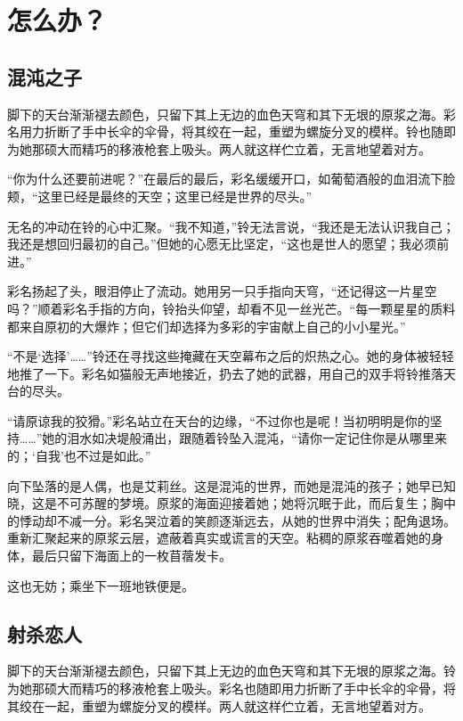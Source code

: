 \chapter{怎么办？}

\section{ 混沌之子}

脚下的天台渐渐褪去颜色，只留下其上无边的血色天穹和其下无垠的原浆之海。彩名用力折断了手中长伞的伞骨，将其绞在一起，重塑为螺旋分叉的模样。铃也随即为她那硕大而精巧的移液枪套上吸头。两人就这样伫立着，无言地望着对方。

“你为什么还要前进呢？”在最后的最后，彩名缓缓开口，如葡萄酒般的血泪流下脸颊，“这里已经是最终的天空；这里已经是世界的尽头。”

无名的冲动在铃的心中汇聚。“我不知道，”铃无法言说，“我还是无法认识我自己；我还是想回归最初的自己。”但她的心愿无比坚定，“这也是世人的愿望；我必须前进。”

彩名扬起了头，眼泪停止了流动。她用另一只手指向天穹，“还记得这一片星空吗？”顺着彩名手指的方向，铃抬头仰望，却看不见一丝光芒。“每一颗星星的质料都来自原初的大爆炸；但它们却选择为多彩的宇宙献上自己的小小星光。”

“不是‘选择’……”铃还在寻找这些掩藏在天空幕布之后的炽热之心。她的身体被轻轻地推了一下。彩名如猫般无声地接近，扔去了她的武器，用自己的双手将铃推落天台的尽头。

“请原谅我的狡猾。”彩名站立在天台的边缘，“不过你也是呢！当初明明是你的坚持……”她的泪水如决堤般涌出，跟随着铃坠入混沌，“请你一定记住你是从哪里来的；‘自我’也不过是如此。”

向下坠落的是人偶，也是艾莉丝。这是混沌的世界，而她是混沌的孩子；她早已知晓，这是不可苏醒的梦境。原浆的海面迎接着她；她将沉眠于此，而后复生；胸中的悸动却不减一分。彩名哭泣着的笑颜逐渐远去，从她的世界中消失；配角退场。重新汇聚起来的原浆云层，遮蔽着真实或谎言的天空。粘稠的原浆吞噬着她的身体，最后只留下海面上的一枚苜蓿发卡。

这也无妨；乘坐下一班地铁便是。

\section{ 射杀恋人}

脚下的天台渐渐褪去颜色，只留下其上无边的血色天穹和其下无垠的原浆之海。铃为她那硕大而精巧的移液枪套上吸头。彩名也随即用力折断了手中长伞的伞骨，将其绞在一起，重塑为螺旋分叉的模样。两人就这样伫立着，无言地望着对方。


